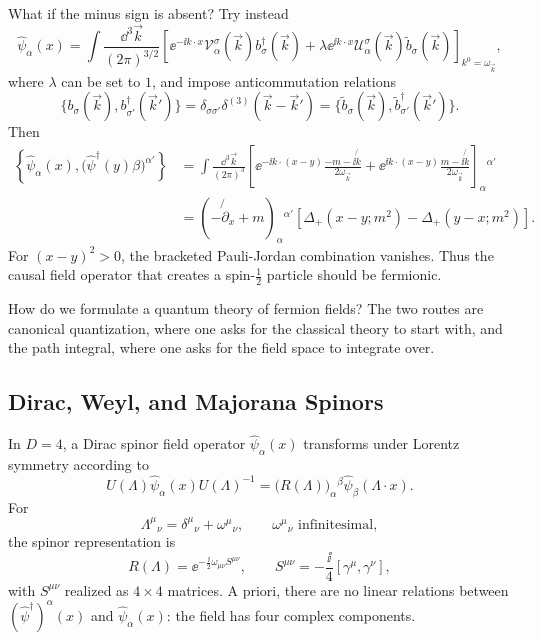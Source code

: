 What if the minus sign is absent?  Try instead
\[
  \widehat\psi_\alpha(x)
  =
  \int\frac{\dd^3\vec k}{(2\pi)^{3/2}}
  \left[
    \ee^{-\ii k\cdot x}
    \mathcal V_\alpha^\sigma(\vec k)b_\sigma^\dagger(\vec k)
    +
    \lambda \ee^{\ii k\cdot x}
    \mathcal U_\alpha^\sigma(\vec k)\widetilde b_\sigma(\vec k)
  \right]_{k^0=\omega_{\vec k}},
\]
where \(\lambda\) can be set to \(1\), and impose anticommutation
relations
\[
  \{b_\sigma(\vec k),b_{\sigma'}^\dagger(\vec k')\}
  =
  \delta_{\sigma\sigma'}\delta^{(3)}(\vec k-\vec k')
  =
  \{\widetilde b_\sigma(\vec k),
  \widetilde b_{\sigma'}^\dagger(\vec k')\}.
\]
Then
\[
\begin{aligned}
  \left\{
    \widehat\psi_\alpha(x),
    \bigl(\widehat\psi^\dagger(y)\beta\bigr)^{\alpha'}
  \right\}
  &=
  \int\frac{\dd^3\vec k}{(2\pi)^3}
  \left[
    \ee^{-\ii k\cdot(x-y)}
    \frac{-m-\ii\not{k}}{2\omega_{\vec k}}
    +
    \ee^{\ii k\cdot(x-y)}
    \frac{m-\ii\not{k}}{2\omega_{\vec k}}
  \right]_\alpha{}^{\alpha'}
  \\
  &=
  (-\not{\partial}_x+m)_\alpha{}^{\alpha'}
  \left[
    \Delta_+(x-y;m^2)-\Delta_+(y-x;m^2)
  \right].
\end{aligned}
\]
For \((x-y)^2>0\), the bracketed Pauli-Jordan combination vanishes.
Thus the causal field operator that creates a spin-\(\frac12\) particle
should be fermionic.

How do we formulate a quantum theory of fermion fields?  The two routes
are canonical quantization, where one asks for the classical theory to
start with, and the path integral, where one asks for the field space to
integrate over.

\subsection{Dirac, Weyl, and Majorana Spinors}

In \(D=4\), a Dirac spinor field operator \(\widehat\psi_\alpha(x)\)
transforms under Lorentz symmetry according to
\[
  U(\Lambda)\widehat\psi_\alpha(x)U(\Lambda)^{-1}
  =
  \bigl(R(\Lambda)\bigr)_\alpha{}^\beta
  \widehat\psi_\beta(\Lambda\cdot x).
\]
For
\[
  \Lambda^\mu{}_\nu=\delta^\mu{}_\nu+\omega^\mu{}_\nu,
  \qquad \omega^\mu{}_\nu \text{ infinitesimal},
\]
the spinor representation is
\[
  R(\Lambda)=\ee^{-\frac{\ii}{2}\omega_{\mu\nu}S^{\mu\nu}},
  \qquad
  S^{\mu\nu}=-\frac{\ii}{4}[\gamma^\mu,\gamma^\nu],
\]
with \(S^{\mu\nu}\) realized as \(4\times4\) matrices.  A priori, there
are no linear relations between \((\widehat\psi^\dagger)^\alpha(x)\) and
\(\widehat\psi_\alpha(x)\): the field has four complex components.

